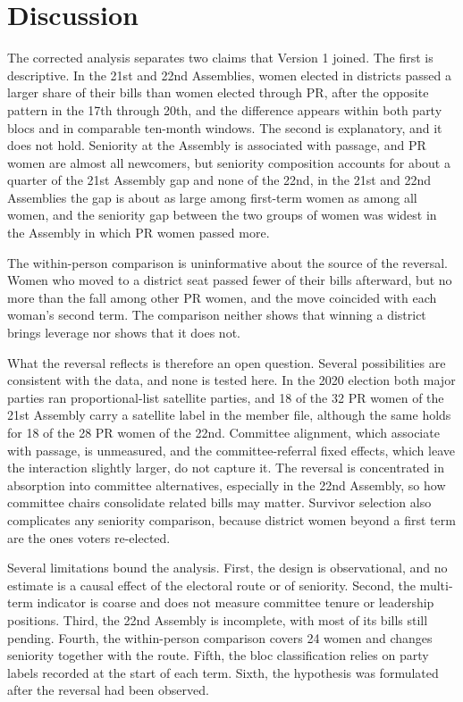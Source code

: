 \documentclass[11pt]{article}
\begin{document}
\section{Discussion}

The corrected analysis separates two claims that Version 1 joined. The first is descriptive. In the 21st and 22nd Assemblies, women elected in districts passed a larger share of their bills than women elected through PR, after the opposite pattern in the 17th through 20th, and the difference appears within both party blocs and in comparable ten-month windows. The second is explanatory, and it does not hold. Seniority at the Assembly is associated with passage, and PR women are almost all newcomers, but seniority composition accounts for about a quarter of the 21st Assembly gap and none of the 22nd, in the 21st and 22nd Assemblies the gap is about as large among first-term women as among all women, and the seniority gap between the two groups of women was widest in the Assembly in which PR women passed more.

The within-person comparison is uninformative about the source of the reversal. Women who moved to a district seat passed fewer of their bills afterward, but no more than the fall among other PR women, and the move coincided with each woman's second term. The comparison neither shows that winning a district brings leverage nor shows that it does not.

What the reversal reflects is therefore an open question. Several possibilities are consistent with the data, and none is tested here. In the 2020 election both major parties ran proportional-list satellite parties, and 18 of the 32 PR women of the 21st Assembly carry a satellite label in the member file, although the same holds for 18 of the 28 PR women of the 22nd. Committee alignment, which \citet{an2025} associate with passage, is unmeasured, and the committee-referral fixed effects, which leave the interaction slightly larger, do not capture it. The reversal is concentrated in absorption into committee alternatives, especially in the 22nd Assembly, so how committee chairs consolidate related bills may matter. Survivor selection also complicates any seniority comparison, because district women beyond a first term are the ones voters re-elected.

Several limitations bound the analysis. First, the design is observational, and no estimate is a causal effect of the electoral route or of seniority. Second, the multi-term indicator is coarse and does not measure committee tenure or leadership positions. Third, the 22nd Assembly is incomplete, with most of its bills still pending. Fourth, the within-person comparison covers 24 women and changes seniority together with the route. Fifth, the bloc classification relies on party labels recorded at the start of each term. Sixth, the hypothesis was formulated after the reversal had been observed.
\end{document}
